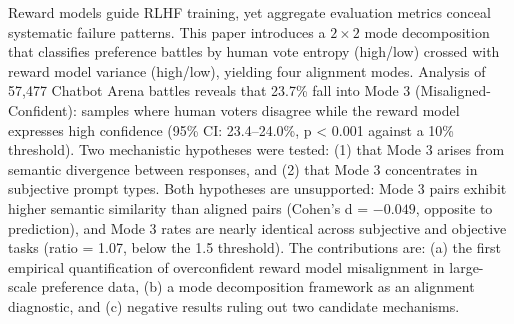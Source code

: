 
Reward models guide RLHF training, yet aggregate evaluation metrics conceal systematic failure patterns. This paper introduces a $2\times 2$ mode decomposition that classifies preference battles by human vote entropy (high/low) crossed with reward model variance (high/low), yielding four alignment modes. Analysis of 57,477 Chatbot Arena battles reveals that 23.7\% fall into Mode 3 (Misaligned-Confident): samples where human voters disagree while the reward model expresses high confidence (95\% CI: 23.4--24.0\%, p < 0.001 against a 10\% threshold). Two mechanistic hypotheses were tested: (1) that Mode 3 arises from semantic divergence between responses, and (2) that Mode 3 concentrates in subjective prompt types. Both hypotheses are unsupported: Mode 3 pairs exhibit higher semantic similarity than aligned pairs (Cohen's d = $-0.049$, opposite to prediction), and Mode 3 rates are nearly identical across subjective and objective tasks (ratio = 1.07, below the 1.5 threshold). The contributions are: (a) the first empirical quantification of overconfident reward model misalignment in large-scale preference data, (b) a mode decomposition framework as an alignment diagnostic, and (c) negative results ruling out two candidate mechanisms.

